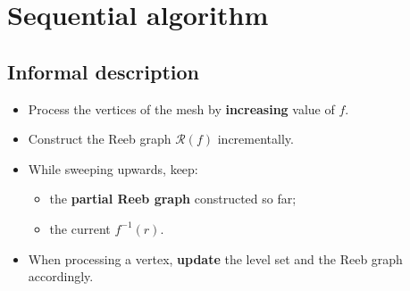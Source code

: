 \section*{Sequential algorithm}

\subsection*{Informal description}
\begin{frame*}
\begin{itemize}
\item Process the vertices of the mesh by \textbf{increasing} value of $f$.
\item Construct the Reeb graph $\mathcal{R}(f)$ incrementally.
\item While sweeping upwards, keep:
\begin{itemize}
\item the \textbf{partial Reeb graph} constructed so far;
\item the current  $f^{-1}(r)$.
\end{itemize}
\item When processing a vertex, \textbf{update} the level set and the Reeb graph accordingly.
\end{itemize}
\end{frame*}

